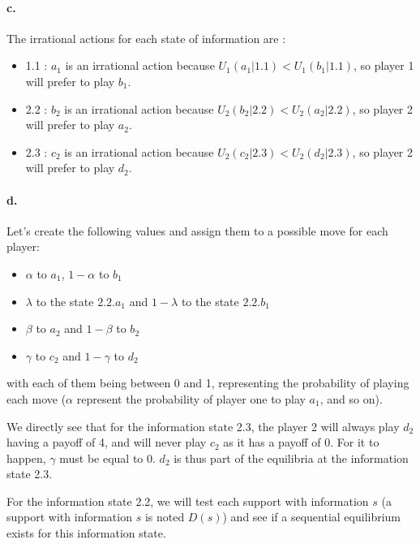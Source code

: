 \paragraph{c.}\label{parac} The irrational actions for each state of information are :

\begin{itemize}
\item 1.1 : $a_1$ is an irrational action because $U_1(a_1|1.1) < U_1(b_1|1.1)$, so player 1 will prefer to play $b_1$.
\item 2.2 : $b_2$ is an irrational action because $U_2(b_2|2.2) < U_2(a_2|2.2)$, so player 2 will prefer to play $a_2$.
\item 2.3 : $c_2$ is an irrational action because $U_2(c_2|2.3) < U_2(d_2|2.3)$, so player 2 will prefer to play $d_2$.
\end{itemize}

\paragraph{d.} Let's create the following values and assign them to a possible move for each player:

\begin{itemize}
    \item $\alpha$ to $a_1$, $1-\alpha$ to $b_1$
    \item $\lambda$ to the state $2.2.a_1$ and $1-\lambda$ to the state $2.2.b_1$
    \item $\beta$ to $a_2$ and $1-\beta$ to $b_2$
    \item $\gamma$ to $c_2$ and $1-\gamma$ to $d_2$
\end{itemize} 
with each of them being between 0 and 1, representing the probability of playing each move ($\alpha$ represent the probability of player one to play $a_1$, and so on).

We directly see that for the information state 2.3, the player 2 will always play $d_2$ having a payoff of 4, and will never play $c_2$ as it has a payoff of 0. For it to happen, $\gamma$ must be equal to 0. $d_2$ is thus part of the equilibria at the information state 2.3. 

For the information state 2.2, we will test each support with information $s$ (a support with information $s$ is noted $D(s)$) and see if a sequential equilibrium exists for this information state. 

